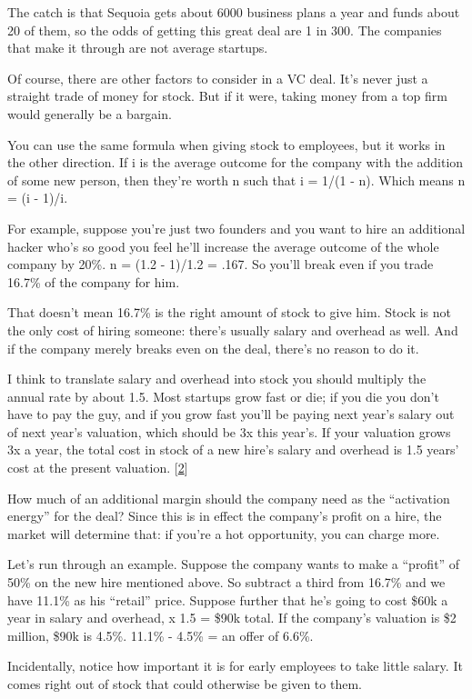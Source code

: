 The catch is that Sequoia gets about 6000 business plans a year and
funds about 20 of them, so the odds of getting this great deal are 1 in
300. The companies that make it through are not average startups.

Of course, there are other factors to consider in a VC deal. It's never
just a straight trade of money for stock. But if it were, taking money
from a top firm would generally be a bargain.

You can use the same formula when giving stock to employees, but it
works in the other direction. If i is the average outcome for the
company with the addition of some new person, then they're worth n such
that i = 1/(1 - n). Which means n = (i - 1)/i.

For example, suppose you're just two founders and you want to hire an
additional hacker who's so good you feel he'll increase the average
outcome of the whole company by 20\%. n = (1.2 - 1)/1.2 = .167. So
you'll break even if you trade 16.7\% of the company for him.

That doesn't mean 16.7\% is the right amount of stock to give him. Stock
is not the only cost of hiring someone: there's usually salary and
overhead as well. And if the company merely breaks even on the deal,
there's no reason to do it.

I think to translate salary and overhead into stock you should multiply
the annual rate by about 1.5. Most startups grow fast or die; if you die
you don't have to pay the guy, and if you grow fast you'll be paying
next year's salary out of next year's valuation, which should be 3x this
year's. If your valuation grows 3x a year, the total cost in stock of a
new hire's salary and overhead is 1.5 years' cost at the present
valuation. {[}\hyperref[f2n]{2}{]}

How much of an additional margin should the company need as the
``activation energy'' for the deal? Since this is in effect the
company's profit on a hire, the market will determine that: if you're a
hot opportunity, you can charge more.

Let's run through an example. Suppose the company wants to make a
``profit'' of 50\% on the new hire mentioned above. So subtract a third
from 16.7\% and we have 11.1\% as his ``retail'' price. Suppose further
that he's going to cost \$60k a year in salary and overhead, x 1.5 =
\$90k total. If the company's valuation is \$2 million, \$90k is 4.5\%.
11.1\% - 4.5\% = an offer of 6.6\%.

Incidentally, notice how important it is for early employees to take
little salary. It comes right out of stock that could otherwise be given
to them.

